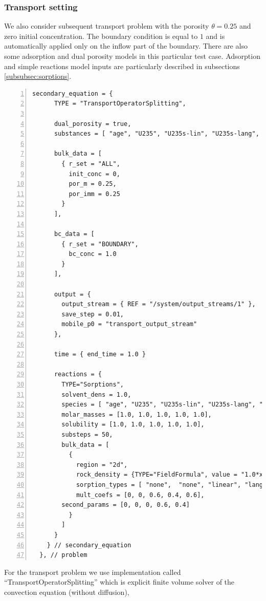 \documentclass[12pt,a4paper]{report}
\begin{document}
\subsubsection{Transport setting}
We also consider subsequent transport problem with the porosity $\theta = 0.25$ and zero initial concentration. The boundary condition is equal to $1$ and is automatically applied only on the 
inflow part of the boundary. There are also some adsorption and dual porosity models in this particular test case. Adsorption and simple reactions model inputs are particularly described in subsections \ref{subsubsec:sorptions}.%

\begin{Verbatim}[numbers=left, firstnumber=last]
     secondary_equation = {
      TYPE = "TransportOperatorSplitting", 

      dual_porosity = true, 
      substances = [ "age", "U235", "U235s-lin", "U235s-lang", "U235s-freund"],
      
      bulk_data = [
        { r_set = "ALL",
          init_conc = 0,
          por_m = 0.25,
          por_imm = 0.25
        }
      ],
      
      bc_data = [
        { r_set = "BOUNDARY",
          bc_conc = 1.0
        }
      ],

      output = {
        output_stream = { REF = "/system/output_streams/1" },
        save_step = 0.01,
        mobile_p0 = "transport_output_stream"
      }, 

      time = { end_time = 1.0 }      

      reactions = {
        TYPE="Sorptions",
        solvent_dens = 1.0,
        species = [ "age", "U235", "U235s-lin", "U235s-lang", "U235s-freund"],
        molar_masses = [1.0, 1.0, 1.0, 1.0, 1.0],
        solubility = [1.0, 1.0, 1.0, 1.0, 1.0],
        substeps = 50,
        bulk_data = [
          {
            region = "2d",
            rock_density = {TYPE="FieldFormula", value = "1.0*x/x"},
            sorption_types = [ "none",  "none", "linear", "langmuir", "freundlich"],
            mult_coefs = [0, 0, 0.6, 0.4, 0.6],
	    second_params = [0, 0, 0, 0.6, 0.4]
          }
        ]
      }
    } // secondary_equation
  }, // problem
\end{Verbatim}
For the transport problem we use implementation called ``TransportOperatorSplitting'' which is explicit finite volume solver of the convection equation (without diffusion), 
\end{document}
